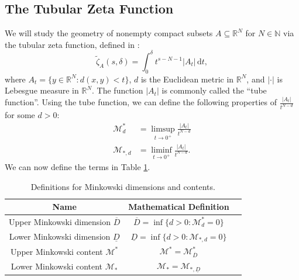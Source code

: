 \documentclass{article}
\theoremstyle{plain}
\numberwithin{equation}{section}
\numberwithin{table}{section}
\numberwithin{figure}{section}
\begin{document}
\subsection{The Tubular Zeta Function} \label{chap:introtubularzeta}
We will study the geometry of nonempty compact subsets $A \subseteq \mathbb{R}^N$ for $N \in \mathbb{N}$ via the tubular zeta function, defined in \cite{lapidusbook}:
\begin{equation}
\tilde{\zeta}_A(s,\delta) = \int_0^{\delta} t^{s-N-1} |A_t| \,\mathrm{d}t, \label{eq:tubularzetafunctiondef}
\end{equation}
where $A_t = \{y \in \mathbb{R}^N : d(x,y) < t\}$, $d$ is the Euclidean metric in $\mathbb{R}^N$, and $|\cdot|$ is Lebesgue measure in $\mathbb{R}^N$. The function $|A_t|$ is commonly called the ``tube function''. Using the tube function, we can define the following properties of $\frac{|A_t|}{t^{N-d}}$ for some $d > 0$:
\begin{align}
\mathscr{M}_d^* &= \limsup_{t\rightarrow0^+} \frac{|A_t|}{t^{N-d}} \\
\mathscr{M}_{*,d} &= \liminf_{t\rightarrow0^+} \frac{|A_t|}{t^{N-d}}.
\end{align}
We can now define the terms in Table \ref{table:minkowskithings}. \\
\begin{table}[!h]
\begin{center}
\begin{tabular}{|c|c|c|}
\hline
\textbf{Name} & \textbf{Mathematical Definition} \\
\hline
\hline
Upper Minkowski dimension $\overline{D}$ & $\overline{D} = \inf\{d > 0 : \mathscr{M}_d^* = 0\}$ \\
\hline
Lower Minkowski dimension $\underline{D}$ & $\underline{D} = \inf\{d > 0 : \mathscr{M}_{*,d} = 0\}$ \\
\hline
Upper Minkowski content $\mathscr{M}^*$ & $\mathscr{M}^* = \mathscr{M}_{\overline{D}}^*$ \\
\hline
Lower Minkowski content $\mathscr{M}_*$ & $\mathscr{M}_* = \mathscr{M}_{*,\underline{D}}$ \\
\hline
\end{tabular}
\caption{Definitions for Minkowski dimensions and contents.}
\label{table:minkowskithings}
\end{center}
\end{table} \\
\end{document}
